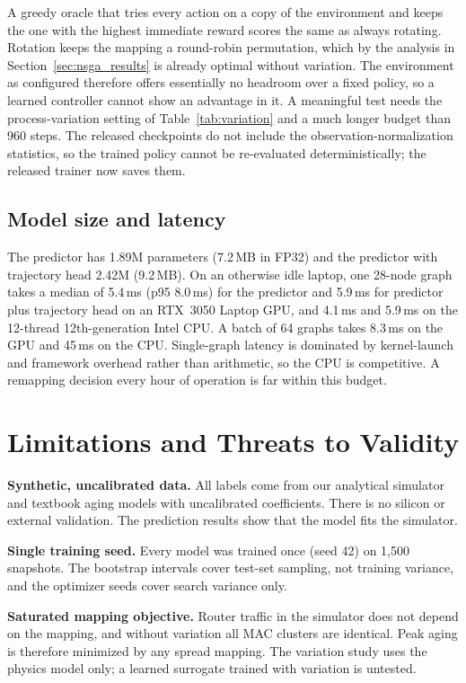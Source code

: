 \documentclass[conference]{IEEEtran}
\begin{document}
A greedy oracle that tries every action on a copy of the environment and keeps the one with the highest immediate reward scores the same as always rotating. Rotation keeps the mapping a round-robin permutation, which by the analysis in Section~\ref{sec:nsga_results} is already optimal without variation. The environment as configured therefore offers essentially no headroom over a fixed policy, so a learned controller cannot show an advantage in it. A meaningful test needs the process-variation setting of Table~\ref{tab:variation} and a much longer budget than 960 steps. The released checkpoints do not include the observation-normalization statistics, so the trained policy cannot be re-evaluated deterministically; the released trainer now saves them.

\subsection{Model size and latency}

The predictor has 1.89M parameters (7.2\,MB in FP32) and the predictor with trajectory head 2.42M (9.2\,MB). On an otherwise idle laptop, one 28-node graph takes a median of 5.4\,ms (p95 8.0\,ms) for the predictor and 5.9\,ms for predictor plus trajectory head on an RTX~3050 Laptop GPU, and 4.1\,ms and 5.9\,ms on the 12-thread 12th-generation Intel CPU. A batch of 64 graphs takes 8.3\,ms on the GPU and 45\,ms on the CPU. Single-graph latency is dominated by kernel-launch and framework overhead rather than arithmetic, so the CPU is competitive. A remapping decision every hour of operation is far within this budget.

\section{Limitations and Threats to Validity}
\label{sec:limitations}

\textbf{Synthetic, uncalibrated data.} All labels come from our analytical simulator and textbook aging models with uncalibrated coefficients. There is no silicon or external validation. The prediction results show that the model fits the simulator.

\textbf{Single training seed.} Every model was trained once (seed 42) on 1{,}500 snapshots. The bootstrap intervals cover test-set sampling, not training variance, and the optimizer seeds cover search variance only.

\textbf{Saturated mapping objective.} Router traffic in the simulator does not depend on the mapping, and without variation all MAC clusters are identical. Peak aging is therefore minimized by any spread mapping. The variation study uses the physics model only; a learned surrogate trained with variation is untested.
\end{document}

